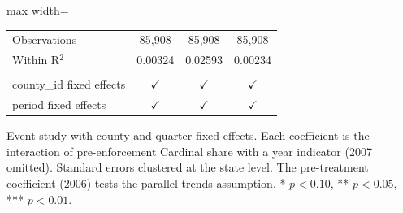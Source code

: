 \begin{table}[htbp]
\begin{adjustbox}{max width=\textwidth}
\begin{tabular}{lccc}
       \\
      Observations                                      & 85,908              & 85,908         & 85,908\\  
      Within R$^2$                                      & 0.00324             & 0.02593        & 0.00234\\  
       \\
      county\_id fixed effects                          & $\checkmark$        & $\checkmark$   & $\checkmark$\\   
      period fixed effects                              & $\checkmark$        & $\checkmark$   & $\checkmark$\\   
      \bottomrule
   \end{tabular}
   \end{adjustbox}
   
   \par \raggedright 
   Event study with county and quarter fixed effects. Each coefficient is the interaction of pre-enforcement Cardinal share with a year indicator (2007 omitted). Standard errors clustered at the state level. The pre-treatment coefficient (2006) tests the parallel trends assumption. * $p<0.10$, ** $p<0.05$, *** $p<0.01$.
\end{table}



